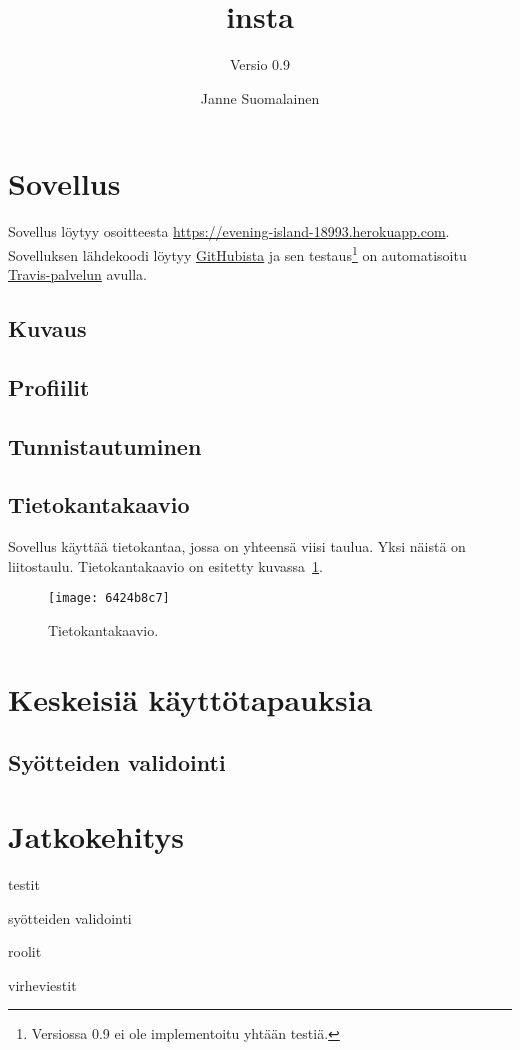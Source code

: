 \documentclass[finnish,colorlinks]{scrartcl}
\begin{document}
\subject{Web"-palvelinohjelmointi Java "=kurssin harjoitustyö}
\title{insta}
\subtitle{Versio 0.9}
\author{Janne Suomalainen}
\maketitle
\tableofcontents
\section{Sovellus}
Sovellus löytyy osoitteesta \url{https://evening-island-18993.herokuapp.com}. Sovelluksen lähdekoodi löytyy \href{https://github.com/suomja1/insta}{GitHubista} ja sen testaus\footnote{Versiossa 0.9 ei ole implementoitu yhtään testiä.} on automatisoitu \href{https://travis-ci.org/suomja1/insta}{Travis-palvelun} avulla.
\subsection{Kuvaus}
\subsection{Profiilit}
\subsection{Tunnistautuminen}
\subsection{Tietokantakaavio}
Sovellus käyttää tietokantaa, jossa on yhteensä viisi taulua. Yksi näistä on liitostaulu. Tietokantakaavio on esitetty kuvassa~\ref{fig:tk}.

\begin{figure}[ht]
\centering
\texttt{[image: 6424b8c7]}
\caption{Tietokantakaavio.}\label{fig:tk}
\end{figure}
\section{Keskeisiä käyttötapauksia}
\subsection{Syötteiden validointi}
\section{Jatkokehitys}
testit

syötteiden validointi

roolit

virheviestit
\end{document}
